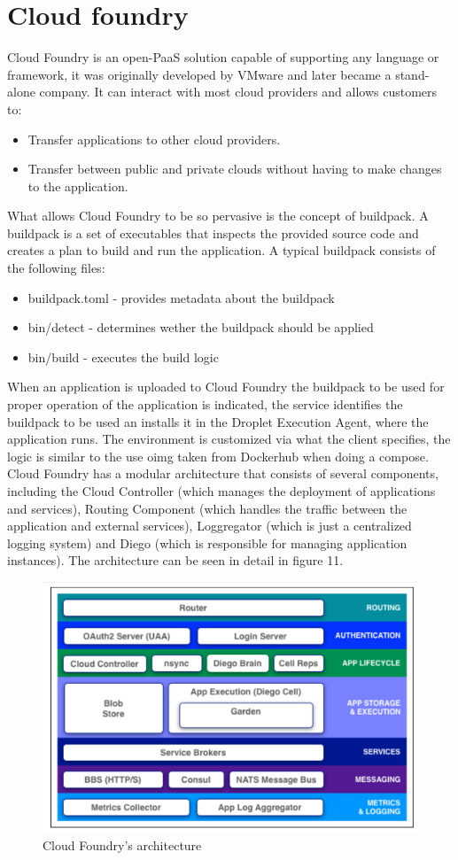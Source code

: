 \section{Cloud foundry}
Cloud Foundry is an open-PaaS solution capable of supporting any language or framework, it was originally developed by VMware and later became a stand-alone company. It can interact with most cloud providers and allows customers to:
\begin{itemize}
    \item Transfer applications to other cloud providers.
    \item Transfer between public and private clouds without having to make changes to the application.
\end{itemize}
What allows Cloud Foundry to be so pervasive is the concept of buildpack. \n
A buildpack is a set of executables that inspects the provided source code and creates a plan to build and run the application. A typical buildpack consists of the following files:
\begin{itemize}
    \item \textsf{buildpack.toml} - provides metadata about the buildpack
    \item \textsf{bin/detect} - determines wether the buildpack should be applied
    \item \textsf{bin/build} - executes the build logic
\end{itemize}
When an application is uploaded to Cloud Foundry the buildpack to be used for proper operation of the application is indicated, the service identifies the buildpack to be used an installs it in the Droplet Execution Agent, where the application runs. \n
The environment is customized via what the client specifies, the logic is similar to the use oimg taken from Dockerhub when doing a compose. \n
Cloud Foundry has a modular architecture that consists of several components, including the Cloud Controller (which manages the deployment of applications and services), Routing Component (which handles the traffic between the application and external services), Loggregator (which is just a centralized logging system) and Diego (which is responsible for managing application instances). The architecture can be seen in detail in figure 11.
\begin{figure}
    \centering
    \includegraphics[scale=0.5]{img/Cloud_Foundry.png}
    \caption{Cloud Foundry's architecture}
\end{figure}
